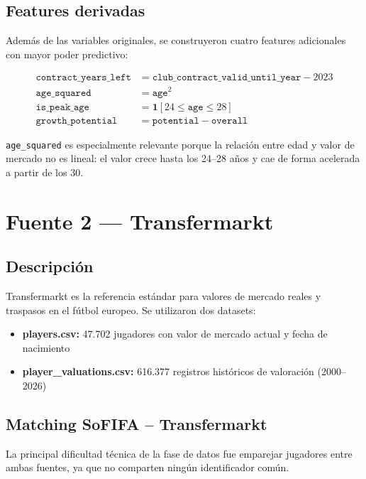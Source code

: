 \documentclass[12pt,a4paper]{report}
\begin{document}
\subsection{Features derivadas}

Además de las variables originales, se construyeron cuatro features adicionales con mayor poder predictivo:

\begin{align}
  \texttt{contract\_years\_left} &= \texttt{club\_contract\_valid\_until\_year} - 2023 \\
  \texttt{age\_squared}          &= \texttt{age}^2 \\
  \texttt{is\_peak\_age}         &= \mathbf{1}[24 \leq \texttt{age} \leq 28] \\
  \texttt{growth\_potential}     &= \texttt{potential} - \texttt{overall}
\end{align}

\texttt{age\_squared} es especialmente relevante porque la relación entre edad y valor de mercado no es lineal: el valor crece hasta los 24--28 años y cae de forma acelerada a partir de los 30.

\section{Fuente 2 --- Transfermarkt}

\subsection{Descripción}

Transfermarkt es la referencia estándar para valores de mercado reales y traspasos en el fútbol europeo. Se utilizaron dos datasets:

\begin{itemize}
  \item \textbf{players.csv:} 47.702 jugadores con valor de mercado actual y fecha de nacimiento
  \item \textbf{player\_valuations.csv:} 616.377 registros históricos de valoración (2000--2026)
\end{itemize}

\subsection{Matching SoFIFA -- Transfermarkt}

La principal dificultad técnica de la fase de datos fue emparejar jugadores entre ambas fuentes, ya que no comparten ningún identificador común.
\end{document}
